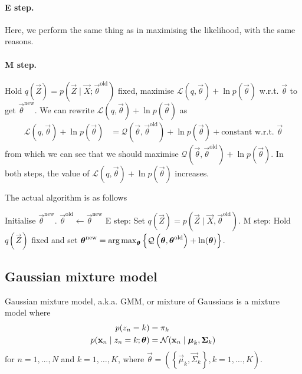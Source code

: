 \paragraph{E step.} Here, we perform the same thing as in maximising the likelihood, with the same reasons.
\paragraph{M step.} Hold $q(\vec Z) = p(\vec Z \mid \vec X; \vec \theta^{\text{old}})$ fixed, maximise $\mathcal L\left(q, \vec \theta\right) + \ln p(\vec \theta)$ w.r.t. $\vec \theta$ to get $\vec \theta^{\text{new}}$. We can rewrite $\mathcal L\left(q, \vec \theta\right) + \ln p(\vec \theta)$ as
\begin{align*}
    \mathcal L\left(q, \vec \theta\right) + \ln p(\vec \theta)  &= \mathcal Q\left(\vec \theta, \vec \theta^{\text{old}}\right) + \ln p(\vec \theta) + \text{constant w.r.t. } \vec \theta
\end{align*}
from which we can see that we should maximise $\mathcal Q\left(\vec \theta, \vec \theta^{\text{old}}\right) + \ln p(\vec \theta)$. In both steps, the value of $\mathcal L(q, \vec \theta) + \ln p(\vec \theta)$ increases.

The actual algorithm is as follows
\begin{algorithmbis}\label{alg:em-post}
    \begin{algorithmic}[1]
        \State Initialise $\vec \theta^{\text{new}}$.
        \Repeat
            \State $\vec \theta^{\text{old}} \gets \vec \theta^{\text{new}}$
            \State E step: Set $q(\vec Z) = p\left(\vec Z \mid \vec X, \vec \theta^{\text{old}}\right)$.
            \State M step: Hold $q(\vec Z)$ fixed and set $\boldsymbol{\mathbf{\theta}}^{\text{new}} = \operatorname*{arg\,max}_{\boldsymbol{\mathbf{\theta}}} \left\{\mathcal Q\left(\boldsymbol{\mathbf{\theta}}, \boldsymbol{\mathbf{\theta}}^{\text{old}}\right) + \ln(\boldsymbol{\mathbf{\theta}})\right\}$. 
    \end{algorithmic}
\end{algorithmbis}

\subsection{Gaussian mixture model}
Gaussian mixture model, a.k.a. GMM, or mixture of Gaussians is a mixture model where
\begin{align}
    p(z_n = k)                              &= \pi_k \\
    p(\boldsymbol{\mathbf{x}}_n \mid z_n = k; \boldsymbol{\mathbf{\theta}})   &= \operatorname{\mathcal N}(\boldsymbol{\mathbf{x}}_n \mid \boldsymbol{\mathbf{\mu}}_k, \boldsymbol{\mathbf{\Sigma}}_k)
\end{align}
for $n = 1, \dotsc, N$ and $k = 1, \dotsc, K$, where $\vec \theta = \left(\left\{\vec \mu_k, \vec \Sigma_k\right\}, k = 1, \dotsc, K\right)$.

